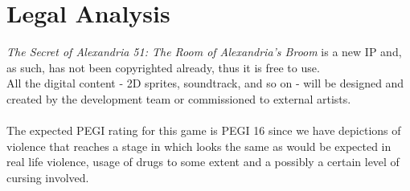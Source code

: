 \section{Legal Analysis}

\textit{The Secret of Alexandria 51: The Room of Alexandria’s Broom} is a new IP and, as such, has not been copyrighted already, thus it is free to use. \\
All the digital content - 2D sprites, soundtrack, and so on - will be designed and created by the development team or commissioned to external artists. \\\\
The expected PEGI rating for this game is PEGI 16 since we have depictions of violence that reaches a stage in which looks the same as would be expected in real life violence, usage of drugs to some extent and a possibly a certain level of cursing involved. \\
\pagebreak 